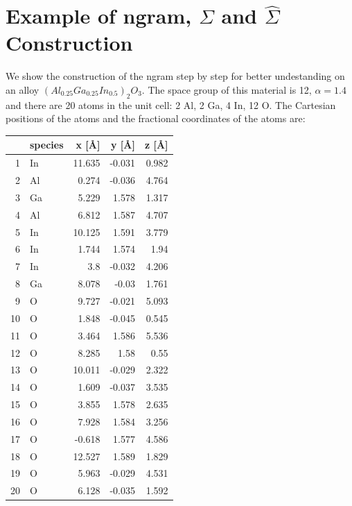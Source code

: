 \documentclass[11pt,oneside,czech,american]{book} %
\theoremstyle{definition} %
\theoremstyle{definition}
\begin{document}
\chapter{Example of ngram, $\Sigma$ and $\hat{\Sigma}$ Construction}
We show the construction of the ngram step by step for better undestanding on an alloy $(Al_{0.25}Ga_{0.25}In_{0.5})_2 O_3$. The space group of this material is 12, $\alpha=1.4$ and there are 20 atoms in the unit cell: 2 Al, 2 Ga, 4 In, 12 O. The Cartesian positions of the atoms and the fractional coordinates of the atoms are:
\begin{table}[h]
	\centering
	\begin{tabular}{rlrrr}
		\hline
		& species   &   x [\AA] &   y [\AA] &   z [\AA] \\
		\hline
		1 & In        &  11.635 &  -0.031 &   0.982 \\
		2 & Al        &   0.274 &  -0.036 &   4.764 \\
		3 & Ga        &   5.229 &   1.578 &   1.317 \\
		4 & Al        &   6.812 &   1.587 &   4.707 \\
		5 & In        &  10.125 &   1.591 &   3.779 \\
		6 & In        &   1.744 &   1.574 &   1.94  \\
		7 & In        &   3.8   &  -0.032 &   4.206 \\
		8 & Ga        &   8.078 &  -0.03  &   1.761 \\
		9 & O         &   9.727 &  -0.021 &   5.093 \\
		10 & O         &   1.848 &  -0.045 &   0.545 \\
		11 & O         &   3.464 &   1.586 &   5.536 \\
		12 & O         &   8.285 &   1.58  &   0.55  \\
		13 & O         &  10.011 &  -0.029 &   2.322 \\
		14 & O         &   1.609 &  -0.037 &   3.535 \\
		15 & O         &   3.855 &   1.578 &   2.635 \\
		16 & O         &   7.928 &   1.584 &   3.256 \\
		17 & O         &  -0.618 &   1.577 &   4.586 \\
		18 & O         &  12.527 &   1.589 &   1.829 \\
		19 & O         &   5.963 &  -0.029 &   4.531 \\
		20 & O         &   6.128 &  -0.035 &   1.592 \\
		\hline

\end{tabular}
\end{table}
\end{document}
